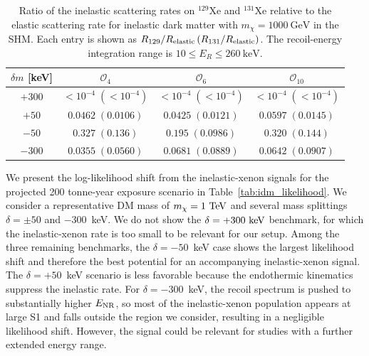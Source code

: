 \documentclass[11pt,a4paper]{article}
\renewcommand{\arraystretch}{1.2}
\begin{document}
\begin{table}[h!]
    \centering
    
    \renewcommand{\arraystretch}{1.25}
    \setlength{\tabcolsep}{12pt}
    
    \begin{tabular}{c|ccc}
        \hline
        $\delta m$ [keV]
        & $\mathcal{O}_4$
        & $\mathcal{O}_6$
        & $\mathcal{O}_{10}$ \\
        \hline

        $+300$
        & $<10^{-4}\;(<10^{-4})$
        & $<10^{-4}\;(<10^{-4})$
        & $<10^{-4}\;(<10^{-4})$ \\
        
        $+50$
        & $0.0462\;(0.0106)$
        & $0.0425\;(0.0121)$
        & $0.0597\;(0.0145)$ \\
        
        $-50$
        & $0.327\;(0.136)$
        & $0.195\;(0.0986)$
        & $0.320\;(0.144)$ \\
        
        
        $-300$
        & $0.0355\;(0.0560)$
        & $0.0681\;(0.0889)$
        & $0.0642\;(0.0907)$ \\
        
        \hline
    \end{tabular}
    \caption{
    Ratio of the inelastic scattering rates on $^{129}$Xe and $^{131}$Xe
    relative to the elastic scattering rate for inelastic dark matter
    with $m_\chi = 1000~\mathrm{GeV}$ in the SHM.
    Each entry is shown as
    $R_{129}/R_{\rm elastic}\,
    (R_{131}/R_{\rm elastic})$.
    The recoil-energy integration range is
    $10 \leq E_R \leq 260~\mathrm{keV}$.
    }
    \label{tab:SHM_iDM_inelastic_elastic_ratio}
\end{table}

We present the log-likelihood shift from the inelastic-xenon signals for the projected 200 tonne-year exposure scenario in Table~\ref{tab:idm_likelihood}. We consider a representative DM mass of $m_\chi=1~{\rm TeV}$ and several mass splittings $\delta=\pm 50$ and $-300$~keV. We do not show the $\delta=+300~{\rm keV}$ benchmark, for which the inelastic-xenon rate is too small to be relevant for our setup. Among the three remaining benchmarks, the $\delta=-50$~keV case shows the largest likelihood shift and therefore the best potential for an accompanying inelastic-xenon signal. The $\delta=+50$~keV scenario is less favorable because the endothermic kinematics suppress the inelastic rate. For $\delta=-300$~keV, the recoil spectrum is pushed to substantially higher $E_{\rm NR}$, so most of the inelastic-xenon population appears at large S1 and falls outside the region we consider, resulting in a negligible likelihood shift. However, the signal could be relevant for studies with a further extended energy range.
\end{document}
